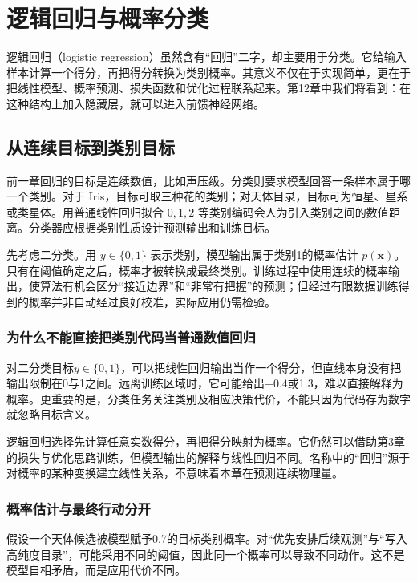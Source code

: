 \chapter{逻辑回归与概率分类}

逻辑回归（logistic regression）虽然含有“回归”二字，却主要用于分类。它给输入样本计算一个得分，再把得分转换为类别概率。其意义不仅在于实现简单，更在于把线性模型、概率预测、损失函数和优化过程联系起来。第12章中我们将看到：在这种结构上加入隐藏层，就可以进入前馈神经网络。
\section{从连续目标到类别目标}
前一章回归的目标是连续数值，比如声压级。分类则要求模型回答一条样本属于哪一个类别。对于 Iris，目标可取三种花的类别；对天体目录，目标可为恒星、星系或类星体。用普通线性回归拟合 $0,1,2$ 等类别编码会人为引入类别之间的数值距离。分类器应根据类别性质设计预测输出和训练目标。

先考虑二分类。用 $y\in\{0,1\}$ 表示类别，模型输出属于类别1的概率估计 $p(\mathbf x)$。只有在阈值确定之后，概率才被转换成最终类别。训练过程中使用连续的概率输出，使算法有机会区分“接近边界”和“非常有把握”的预测；但经过有限数据训练得到的概率并非自动经过良好校准，实际应用仍需检验。

\subsection{为什么不能直接把类别代码当普通数值回归}
对二分类目标$y\in\{0,1\}$，可以把线性回归输出当作一个得分，但直线本身没有把输出限制在0与1之间。远离训练区域时，它可能给出$-0.4$或1.3，难以直接解释为概率。更重要的是，分类任务关注类别及相应决策代价，不能只因为代码存为数字就忽略目标含义。

逻辑回归选择先计算任意实数得分，再把得分映射为概率。它仍然可以借助第3章的损失与优化思路训练，但模型输出的解释与线性回归不同。名称中的“回归”源于对概率的某种变换建立线性关系，不意味着本章在预测连续物理量。

\subsection{概率估计与最终行动分开}
假设一个天体候选被模型赋予0.7的目标类别概率。对“优先安排后续观测”与“写入高纯度目录”，可能采用不同的阈值，因此同一个概率可以导致不同动作。这不是模型自相矛盾，而是应用代价不同。

